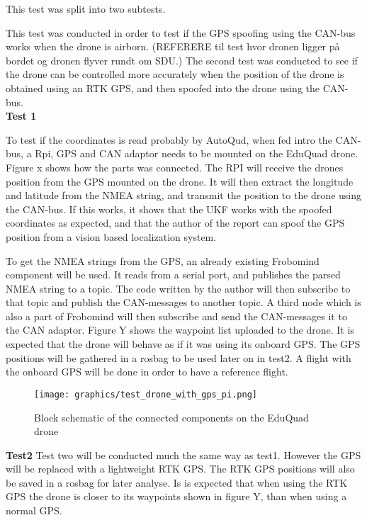 This test was split into two subtests.

This test was conducted in order to test if the GPS spoofing using the CAN-bus works when the drone is airborn. 
(REFERERE til test hvor dronen ligger på bordet og dronen flyver rundt om SDU.)
The second test was conducted to see if the drone can be controlled more accurately when the position of the drone is obtained using an RTK GPS, and then spoofed into the drone using the CAN-bus.\\


\textbf{Test 1}

To test if the coordinates is read probably by AutoQud, when fed intro the CAN-bus, a Rpi, GPS and CAN adaptor needs to be mounted on the EduQuad drone.  Figure x shows how the parts was connected. The RPI will receive the drones position from the GPS mounted on the drone. It will then extract the longitude and latitude from the NMEA string, and transmit the position to the drone using the CAN-bus. 
If this works, it shows that the UKF works with the spoofed coordinates as expected, and that the author of the report can spoof the GPS position from a vision based localization system.

To get the NMEA strings from the GPS, an already existing Frobomind component will be used. It reads from a serial port, and publishes the parsed NMEA string to a topic. The code written by the author will then subscribe to that topic and publish the CAN-messages to another topic. A third node which is also a part of Frobomind will then subscribe and send the CAN-messages  it to the CAN adaptor. 
Figure Y shows the waypoint list uploaded to the drone. It is expected that the drone will behave as if it was using its onboard GPS.
The GPS positions will be gathered in a rosbag to be used later on in test2.
A flight with the onboard GPS will be done in order to have a reference flight.\\

\begin{figure}[H]
    \center
    \texttt{[image: graphics/test\_drone\_with\_gps\_pi.png]}
    \caption{Block schematic of the connected components on the EduQuad drone}
    \label{fig:PCB_block}
\end{figure}

\textbf{Test2}
Test two will be conducted much the same way as test1. However the GPS will be replaced with a lightweight RTK GPS. The RTK GPS positions will also be saved in a rosbag for later analyse. Is is expected that when using the RTK GPS the drone is closer to its waypoints  shown in figure Y, than when using a normal GPS.


